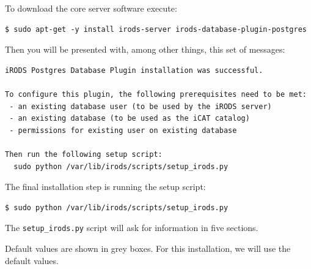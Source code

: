 \documentclass[10pt,oneside]{memoir}
\begin{document}
To download the core server software execute:

\begin{lstlisting}
$ sudo apt-get -y install irods-server irods-database-plugin-postgres
\end{lstlisting}

Then you will be presented with, among other things, this set of messages:

\begin{lstlisting}
iRODS Postgres Database Plugin installation was successful.

To configure this plugin, the following prerequisites need to be met:
 - an existing database user (to be used by the iRODS server)
 - an existing database (to be used as the iCAT catalog)
 - permissions for existing user on existing database

Then run the following setup script:
  sudo python /var/lib/irods/scripts/setup_irods.py
\end{lstlisting}

The final installation step is running the setup script:

\begin{lstlisting}
$ sudo python /var/lib/irods/scripts/setup_irods.py
\end{lstlisting}

\newpage
The \texttt{setup\_irods.py} script will ask for information in five sections.

Default values are shown in grey boxes.  For this installation, we will use the default values.
\end{document}
